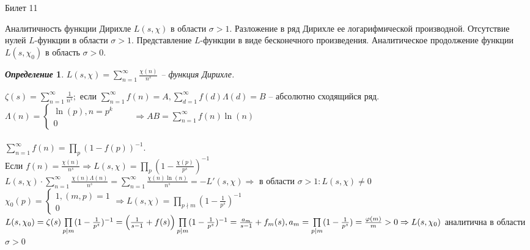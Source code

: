 \documentclass[a4paper,12pt]{article}
\newtheorem{deff}{\textit{Определение}}
\newcommand{\FI}{\varphi}
\newcommand{\q}{\quad}
\newcommand{\Ra}{\Rightarrow}
\newcommand{\SL}{\sum\limits}
\newcommand{\os}{\left(}
\newcommand{\cs}{\right)}
\begin{document}
\newpage
\begin{mybox}{\hypertarget{bil11}{Билет 11}}

\begin{formbox}{}
Аналитичность функции Дирихле $L(s,\chi)$ в области $\sigma > 1$. Разложение в ряд Дирихле ее логарифмической производной. Отсутствие нулей $L$-функции в области $\sigma > 1$. Представление $L$-функции в виде бесконечного произведения. Аналитическое продолжение функции $L(s,\chi_0)$ в область $\sigma > 0$.
\end{formbox}
\begin{formbox}{}
\begin{deff}
$L(s,\chi) = \SL_{n=1}^\infty \frac{\chi(n)}{n^s}$ -- функция Дирихле.
\end{deff}
\end{formbox}
$\zeta(s) = \SL_{n=1}^\infty \frac{1}{n^s};$ если $\SL_{n=1}^\infty f(n) = A, \SL_{d=1}^\infty f(d)\Lambda(d) = B$ -- абсолютно сходящийся ряд. $\Lambda(n) = \begin{cases} \ln(p), n=p^k\\0  \end{cases} \q\q \Ra AB = \SL_{n=1}^\infty f(n)\ln(n)$\\\q\\
$\SL_{n=1}^\infty f(n) = \prod\limits_p \os 1 - f(p)\cs^{-1}$.\\ Если $f(n) = \frac{\chi(n)}{n^s}\Ra L(s,\chi) = \prod\limits_p \os 1 - \frac{\chi(p)}{p^s}   \cs^{-1} $\\
$L(s,\chi) \cdot \SL_{n=1}^\infty \frac{\chi(n)\Lambda(n)}{n^s} = \SL_{n=1}^\infty \frac{\chi(n)\ln(n)}{n^s}  = -L'(s,\chi)\Ra $ в области $\sigma > 1: L(s,\chi)\not=0$\\
$\chi_0(p) = \begin{cases} 1, (m,p) = 1\\0  \end{cases}\Ra L(s,\chi) = \prod\limits_{p\nmid m}(1 - \frac{1}{p^s})^{-1} $\\
$L(s,\chi_0) = \zeta(s) \prod\limits_{p\mid m} (1 - \frac{1}{p^s})^{-1} = \os \frac{1}{s-1} + f(s) \cs  \prod\limits_{p\mid m} (1 - \frac{1}{p^s})^{-1} = \frac{a_m}{s-1} + f_m(s),\\ a_m = \prod\limits_{p\mid m} (1 - \frac{1}{p^s}) = \frac{\FI(m)}{m} > 0 \Ra  L(s,\chi_0)$  аналитична в области $\sigma > 0$
\end{mybox}
\end{document}
